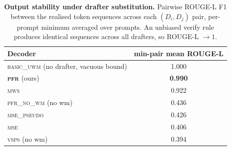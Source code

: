 \begin{table}[h]
\centering
\caption{\textbf{Output stability under drafter substitution.}
Pairwise ROUGE-L F1 between the realised token sequences across each
$(D_i,D_j)$ pair, per-prompt minimum averaged over prompts. An
unbiased verify rule produces identical sequences across all
drafters, so ROUGE-L $\to 1$.}
\label{tab:exp2_pairwise_rouge}
\small
\setlength{\tabcolsep}{8pt}
\begin{tabular}{lc}
\toprule
Decoder & min-pair mean ROUGE-L \\
\midrule
\textsc{basic\_uwm} (no drafter, vacuous bound) & 1.000 \\
\textbf{\textsc{pfr}} (ours)                    & \textbf{0.990} \\
\textsc{mws}                                    & 0.922 \\
\midrule
\textsc{pfr\_no\_wm} (no wm)                    & 0.436 \\
\textsc{mse\_pseudo}                            & 0.426 \\
\textsc{mse}                                    & 0.406 \\
\textsc{vsps} (no wm)                           & 0.394 \\
\bottomrule
\end{tabular}
\end{table}